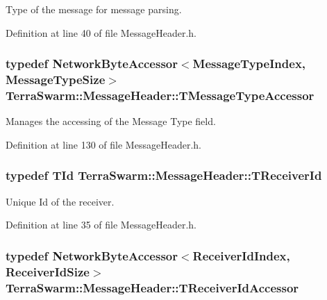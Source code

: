 Type of the message for message parsing. 



Definition at line 40 of file Message\-Header.\-h.

\hypertarget{class_terra_swarm_1_1_message_header_ae21a1eeb66f61c557c12f05440aa6f5b}{
\subsubsection[{T\-Message\-Type\-Accessor}]{\setlength{\rightskip}{0pt plus 5cm}typedef {\bf Network\-Byte\-Accessor}$<${\bf Message\-Type\-Index}, {\bf Message\-Type\-Size}$>$ {\bf Terra\-Swarm\-::\-Message\-Header\-::\-T\-Message\-Type\-Accessor}\hspace{0.3cm}{\ttfamily [private]}}}\label{class_terra_swarm_1_1_message_header_ae21a1eeb66f61c557c12f05440aa6f5b}


Manages the accessing of the Message Type field. 



Definition at line 130 of file Message\-Header.\-h.

\hypertarget{class_terra_swarm_1_1_message_header_aa3260702b182b6f88ddbdd3416e98df0}{
\subsubsection[{T\-Receiver\-Id}]{\setlength{\rightskip}{0pt plus 5cm}typedef {\bf T\-Id} {\bf Terra\-Swarm\-::\-Message\-Header\-::\-T\-Receiver\-Id}}}\label{class_terra_swarm_1_1_message_header_aa3260702b182b6f88ddbdd3416e98df0}


Unique Id of the receiver. 



Definition at line 35 of file Message\-Header.\-h.

\hypertarget{class_terra_swarm_1_1_message_header_a9725379883f5e9451d235fb4bd1c8ee3}{
\subsubsection[{T\-Receiver\-Id\-Accessor}]{\setlength{\rightskip}{0pt plus 5cm}typedef {\bf Network\-Byte\-Accessor}$<${\bf Receiver\-Id\-Index}, {\bf Receiver\-Id\-Size}$>$ {\bf Terra\-Swarm\-::\-Message\-Header\-::\-T\-Receiver\-Id\-Accessor}\hspace{0.3cm}{\ttfamily [private]}}}\label{class_terra_swarm_1_1_message_header_a9725379883f5e9451d235fb4bd1c8ee3}


